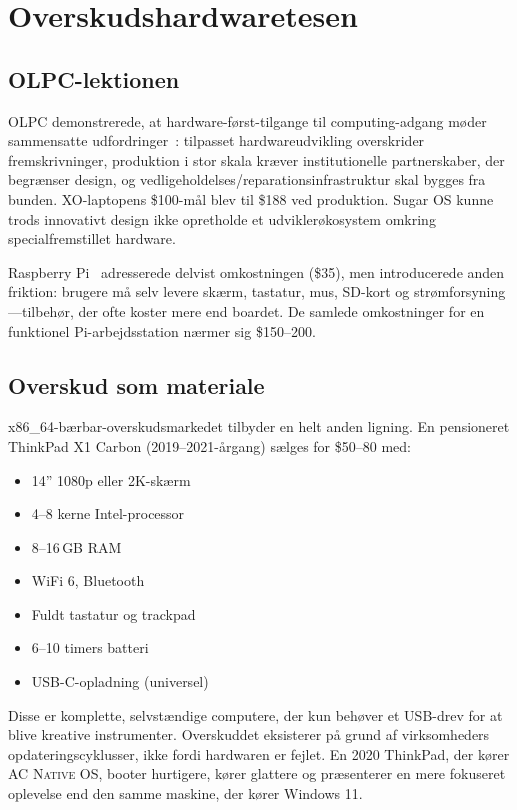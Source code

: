 \documentclass[10pt,letterpaper,twocolumn]{article}
\newcommand{\acos}{\textsc{AC Native OS}}
\begin{document}
\section{Overskudshardwaretesen}
\label{sec:surplus}

\subsection{OLPC-lektionen}

OLPC demonstrerede, at hardware-først-tilgange til computing-adgang møder sammensatte udfordringer~\citep{kraemer2009olpc}: tilpasset hardwareudvikling overskrider fremskrivninger, produktion i stor skala kræver institutionelle partnerskaber, der begrænser design, og vedligeholdelses/reparationsinfrastruktur skal bygges fra bunden. XO-laptopens \$100-mål blev til \$188 ved produktion. Sugar OS kunne trods innovativt design ikke opretholde et udviklerøkosystem omkring specialfremstillet hardware.

Raspberry Pi~\citep{raspberry2012} adresserede delvist omkostningen (\$35), men introducerede anden friktion: brugere må selv levere skærm, tastatur, mus, SD-kort og strømforsyning---tilbehør, der ofte koster mere end boardet. De samlede omkostninger for en funktionel Pi-arbejdsstation nærmer sig \$150--200.

\subsection{Overskud som materiale}

x86\_64-bærbar-overskudsmarkedet tilbyder en helt anden ligning. En pensioneret ThinkPad X1 Carbon (2019--2021-årgang) sælges for \$50--80 med:

\begin{itemize}
  \item 14'' 1080p eller 2K-skærm
  \item 4--8 kerne Intel-processor
  \item 8--16\,GB RAM
  \item WiFi 6, Bluetooth
  \item Fuldt tastatur og trackpad
  \item 6--10 timers batteri
  \item USB-C-opladning (universel)
\end{itemize}

Disse er komplette, selvstændige computere, der kun behøver et USB-drev for at blive kreative instrumenter. Overskuddet eksisterer på grund af virksomheders opdateringscyklusser, ikke fordi hardwaren er fejlet. En 2020 ThinkPad, der kører \acos{}, booter hurtigere, kører glattere og præsenterer en mere fokuseret oplevelse end den samme maskine, der kører Windows 11.
\end{document}
